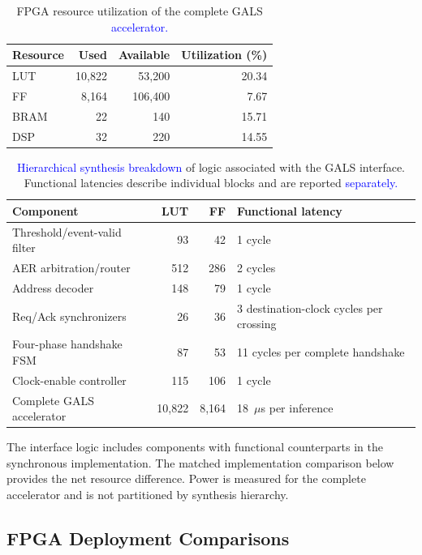 \documentclass[12pt]{article}
\newcommand{\rev}[1]{\textcolor{blue}{#1}}
\begin{document}
\begin{table}[!htbp]
\centering
\caption{FPGA resource utilization of the complete GALS \rev{accelerator.}}
\label{tab:fpga_resource}
\footnotesize
\renewcommand{\arraystretch}{1.2}
\setlength{\tabcolsep}{4pt}
\begin{tabular}{@{}lrrr@{}}
\toprule
Resource & Used & Available & Utilization (\%) \\
\midrule
LUT &  10,822 &  53,200 & 20.34 \\
FF &  8,164 &  106,400 & 7.67 \\
BRAM & 22 & 140 & 15.71 \\
DSP & 32 & 220 & 14.55 \\
\bottomrule
\end{tabular}
\end{table}

\begin{table}[!htbp]
\centering
\caption{\rev{Hierarchical synthesis breakdown} of logic associated with the GALS interface. Functional latencies describe individual blocks and are reported \rev{separately.}}
\label{tab:gals_component_overhead}
\scriptsize
\renewcommand{\arraystretch}{1.15}
\setlength{\tabcolsep}{3pt}
\begin{tabular}{@{}lrrl@{}}
\toprule
Component & LUT & FF & Functional latency \\
\midrule
Threshold/event-valid filter & 93 & 42 & 1 cycle \\
AER arbitration/router & 512 & 286 & 2 cycles \\
Address decoder & 148 & 79 & 1 cycle \\
Req/Ack synchronizers & 26 & 36 & 3 destination-clock cycles per crossing \\
Four-phase handshake FSM & 87 & 53 & 11 cycles per complete handshake \\
Clock-enable controller & 115 & 106 & 1 cycle \\
\midrule
Complete GALS accelerator & 10,822 & 8,164 & 18~$\mu$s per inference \\
\bottomrule
\end{tabular}
\end{table}

The interface logic includes components with functional counterparts in the synchronous implementation. The matched implementation comparison below provides the net resource difference. Power is measured for the complete accelerator and is not partitioned by synthesis hierarchy.

\subsection{FPGA Deployment Comparisons}
\end{document}
